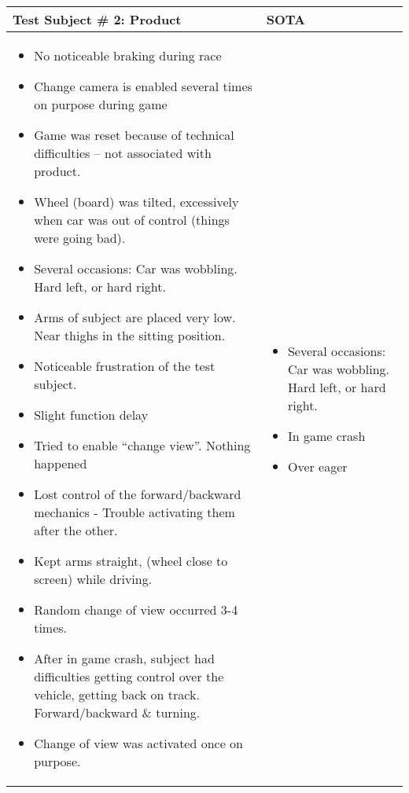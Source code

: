 \begin{table}[!htbp]
\centering
\begin{tabular}{| p{3.4in} | p{2in} |}
\hline
	\textbf{Test Subject \# 2: Product} & \textbf{SOTA}\\
\hline
	\begin{itemize}
		\item No noticeable braking during race
		\item Change camera is enabled several times on purpose during game
		\item Game was reset because of technical difficulties – not associated with product.
		\item Wheel (board) was tilted, excessively when car was out of control (things were going bad).
		\item Several occasions: Car was wobbling. Hard left, or hard right.
		\item Arms of subject are placed very low. Near thighs in the sitting position.
		\item Noticeable frustration of the test subject.
		\item Slight function delay
		\item Tried to enable “change view”. Nothing happened
		\item Lost control of the forward/backward mechanics  - Trouble activating them after the other.
		\item Kept arms straight, (wheel close to screen) while driving.
		\item Random change of view occurred 3-4 times.
		\item After in game crash, subject had difficulties getting control over the vehicle, getting back on track. Forward/backward \& turning.
		\item Change of view was activated once on purpose.
	\end{itemize}
	&
	\begin{itemize}
		\item Several occasions: Car was wobbling. Hard left, or hard right.
		\item In game crash
		\item Over eager
	\end{itemize}
	\\
\hline
\end{tabular}
\end{table}


